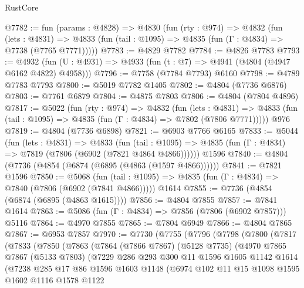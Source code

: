 \begin{lexlean}{RustCore}
\begin{coremodule}
@7782 := fun (params : @4828) =>
  @4830
    (fun (rty : @974) =>
    @4832
      (fun (lets : @4831) =>
      @4833 (fun (tail : @1095) => @4835 (fun (Γ : @4834) => @7738 (@7765 @7771)))))
@7783 := @4829 @7782
@7784 := @4826 @7783
@7793 := @4932 (fun (U : @4931) => @4933 (fun (t : @7) => @4941 (@4804 (@4947 @6162 @4822) @4958)))
@7796 := @7758 (@7784 @7793) @6160
@7798 := @4789 @7783 @7793
@7800 := @5019 @7782 @1405
@7802 := @4804 (@7736 @6876)
@7803 := @7761 @6879
@7804 := @4875 @7803
@7806 := @4804 (@7804 @4896)
@7817 := @5022
    (fun (rty : @974) =>
    @4832
      (fun (lets : @4831) =>
      @4833 (fun (tail : @1095) => @4835 (fun (Γ : @4834) => @7802 (@7806 @7771)))))
    @976
@7819 := @4804 (@7736 @6898)
@7821 := @6903 @7766 @6165
@7833 := @5044
    (fun (lets : @4831) =>
    @4833
      (fun (tail : @1095) => @4835 (fun (Γ : @4834) => @7819 (@7806 (@6902 (@7821 @4864 @4866))))))
    @1596
@7840 := @4804 (@7736 (@4854 (@6874 (@6895 (@4863 (@1597 @4866))))))
@7841 := @7821 @1596
@7850 := @5068
    (fun (tail : @1095) => @4835 (fun (Γ : @4834) => @7840 (@7806 (@6902 (@7841 @4866)))))
    @1614
@7855 := @7736 (@4854 (@6874 (@6895 (@4863 @1615))))
@7856 := @4804 @7855
@7857 := @7841 @1614
@7863 := @5086 (fun (Γ : @4834) => @7856 (@7806 (@6902 @7857))) @5116
@7864 := @4970 @7855
@7865 := @7804 @6949
@7866 := @4804 @7865
@7867 := @6953 @7857
@7970 := @7730
    (@7755
      (@7796
        (@7798
          (@7800
            (@7817
              (@7833
                (@7850
                  (@7863
                    (@7864
                      (@7866 @7867)
                      (@5128 @7735)
                      (@4970
                        @7865
                        @7867
                        (@5133 @7803)
                        (@7229
                          @286
                          @293
                          @300
                          @11
                          @1596
                          @1605
                          @1142
                          @1614
                          (@7238
                            @285
                            @17
                            @86
                            @1596
                            @1603
                            @1148
                            (@6974
                              @102
                              @11
                              @15
                              @1098
                              @1595
                              @1602
                              @1116
                              @1578
                              @1122

\end{coremodule}
\end{lexlean}

